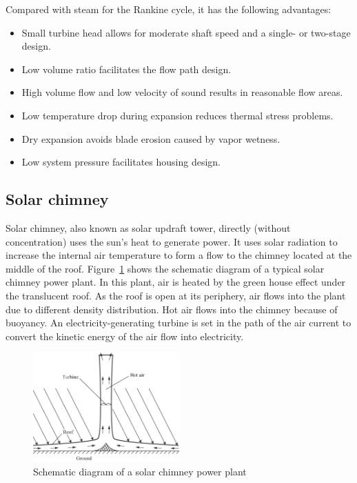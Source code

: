 Compared with steam for the Rankine cycle, it has the following advantages:
\begin{itemize}
  \item  Small turbine head allows for moderate shaft speed and a single- or two-stage design.
    \item Low volume ratio facilitates the flow path design.
    \item High volume flow and low velocity of sound results in reasonable flow areas.
    \item Low temperature drop during expansion reduces thermal stress problems.
    \item Dry expansion avoids blade erosion caused by vapor wetness.
    \item Low system pressure facilitates housing design.
  \end{itemize}

\subsection{Solar chimney}
\label{sec:sc}
Solar chimney, also known as solar updraft tower, directly (without concentration) uses the sun's heat to generate power. It uses solar radiation to increase the internal air temperature to form a flow to the chimney located at the middle of the roof. Figure~\ref{fig:SolarChimney} shows the schematic diagram of a typical solar chimney power plant. In this plant, air is heated by the green house effect under the translucent roof. As the roof is open at its periphery, air flows into the plant due to different density distribution. Hot air flows into the chimney because of buoyancy. An electricity-generating turbine is set in the path of the air current to convert the kinetic energy of the air flow into electricity.

\begin{figure}[!ht]
\centering 
\includegraphics[width=0.5\textwidth]{fig/SolarChimney}
\caption{Schematic diagram of a solar chimney power plant}\label{fig:SolarChimney}
\end{figure}

